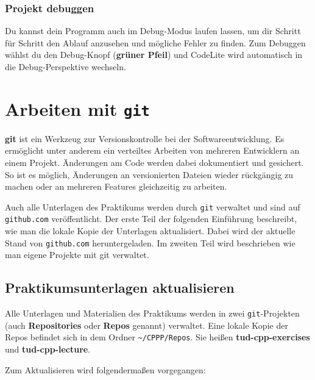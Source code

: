 \subsubsection{Projekt debuggen}
Du kannst dein Programm auch im Debug-Modus laufen lassen, um dir Schritt für Schritt den Ablauf anzusehen und mögliche Fehler zu finden.
Zum Debuggen wählst du den Debug-Knopf (\textbf{grüner Pfeil}) und CodeLite wird automatisch in die Debug-Perspektive wechseln. 

\section{\ExercisePrefixAdditionalInformation Arbeiten mit \texttt{git}}

\textbf{git} ist ein Werkzeug zur Versionskontrolle bei der Softwareentwicklung.
Es ermöglicht unter anderem ein verteiltes Arbeiten von mehreren Entwicklern an einem Projekt.
Änderungen am Code werden dabei dokumentiert und gesichert.
So ist es möglich, Änderungen an versionierten Dateien wieder rückgängig zu machen oder an mehreren Features gleichzeitig zu arbeiten.

Auch alle Unterlagen des Praktikums werden durch \texttt{git} verwaltet und sind auf \texttt{github.com} veröffentlicht.
Der erste Teil der folgenden Einführung beschreibt, wie man die lokale Kopie der Unterlagen aktualisiert.
Dabei wird der aktuelle Stand von \texttt{github.com} heruntergeladen.
Im zweiten Teil wird beschrieben wie man eigene Projekte mit git verwaltet.

\subsection{Praktikumsunterlagen aktualisieren}
Alle Unterlagen und Materialien des Praktikums werden in zwei \texttt{git}-Projekten (auch \textbf{Repositories} oder \textbf{Repos} genannt) verwaltet.
Eine lokale Kopie der Repos befindet sich in dem Ordner \lstinline{~/CPPP/Repos}.
Sie heißen \textbf{tud-cpp-exercises} und \textbf{tud-cpp-lecture}.

Zum Aktualisieren wird folgendermaßen vorgegangen:

